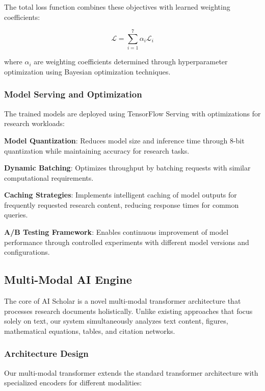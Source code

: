 \documentclass[10pt,twocolumn]{article}
\begin{document}
The total loss function combines these objectives with learned weighting coefficients:

\begin{equation}
\mathcal{L} = \sum_{i=1}^{7} \alpha_i \mathcal{L}_i
\end{equation}

where $\alpha_i$ are weighting coefficients determined through hyperparameter optimization using Bayesian optimization techniques.

\subsubsection{Model Serving and Optimization}

The trained models are deployed using TensorFlow Serving with optimizations for research workloads:

\textbf{Model Quantization}: Reduces model size and inference time through 8-bit quantization while maintaining accuracy for research tasks.

\textbf{Dynamic Batching}: Optimizes throughput by batching requests with similar computational requirements.

\textbf{Caching Strategies}: Implements intelligent caching of model outputs for frequently requested research content, reducing response times for common queries.

\textbf{A/B Testing Framework}: Enables continuous improvement of model performance through controlled experiments with different model versions and configurations.

\subsection{Multi-Modal AI Engine}

The core of AI Scholar is a novel multi-modal transformer architecture that processes research documents holistically. Unlike existing approaches that focus solely on text, our system simultaneously analyzes text content, figures, mathematical equations, tables, and citation networks.

\subsubsection{Architecture Design}

Our multi-modal transformer extends the standard transformer architecture \cite{vaswani2017attention} with specialized encoders for different modalities:
\end{document}
